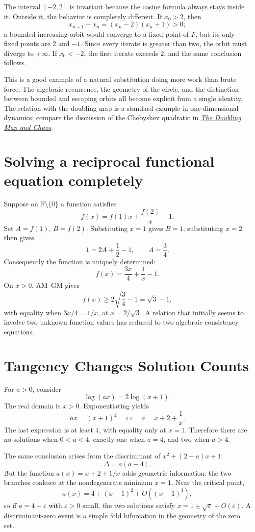 The interval $[-2,2]$ is invariant because the cosine formula always stays inside it. Outside it, the behavior is completely different. If $x_0>2$, then
\[
 x_{n+1}-x_n=(x_n-2)(x_n+1)>0;
\]
a bounded increasing orbit would converge to a fixed point of $F$, but its only fixed points are $2$ and $-1$. Since every iterate is greater than two, the orbit must diverge to $+\infty$. If $x_0<-2$, the first iterate exceeds $2$, and the same conclusion follows.

This is a good example of a natural substitution doing more work than brute force. The algebraic recurrence, the geometry of the circle, and the distinction between bounded and escaping orbits all become explicit from a single identity. The relation with the doubling map is a standard example in one-dimensional dynamics; compare the discussion of the Chebyshev quadratic in \href{https://marksmath.org/classes/Fall2017ChaosAndFractals/chaos_and_fractals/section-chaos_and_doubling.html}{\emph{The Doubling Map and Chaos}}.

\section{Solving a reciprocal functional equation completely}

Suppose on \(\mathbb R\setminus\{0\}\) a function satisfies
\[
 f(x)=f(1)x+\frac{f(2)}x-1.
\]
Set \(A=f(1)\), \(B=f(2)\). Substituting \(x=1\) gives \(B=1\); substituting \(x=2\) then gives
\[
 1=2A+\frac12-1,\qquad A=\frac34.
\]
Consequently the function is uniquely determined:
\[
 \boxed{f(x)=\frac{3x}{4}+\frac1x-1.}
\]
On \(x>0\), AM--GM gives
\[
 f(x)\ge2\sqrt{\frac34}-1=\sqrt3-1,
\]
with equality when \(3x/4=1/x\), at \(x=2/\sqrt3\). A relation that initially seems to involve two unknown function values has reduced to two algebraic consistency equations.

\section{Tangency Changes Solution Counts}

For \(a>0\), consider
\[
 \log(ax)=2\log(x+1).
\]
The real domain is \(x>0\). Exponentiating yields
\[
 ax=(x+1)^2
 \quad\Longleftrightarrow\quad
 a=x+2+\frac1x.
\]
The last expression is at least \(4\), with equality only at \(x=1\). Therefore there are no solutions when \(0<a<4\), exactly one when \(a=4\), and two when \(a>4\).

The same conclusion arises from the discriminant of \(x^2+(2-a)x+1\):
\[
 \Delta=a(a-4).
\]
But the function \(a(x)=x+2+1/x\) adds geometric information: the two branches coalesce at the nondegenerate minimum \(x=1\). Near the critical point,
\[
 a(x)=4+(x-1)^2+O((x-1)^3),
\]
so if \(a=4+\varepsilon\) with \(\varepsilon>0\) small, the two solutions satisfy
\(x=1\pm\sqrt\varepsilon+O(\varepsilon)\). A discriminant-zero event is a simple fold bifurcation in the geometry of the zero set.

